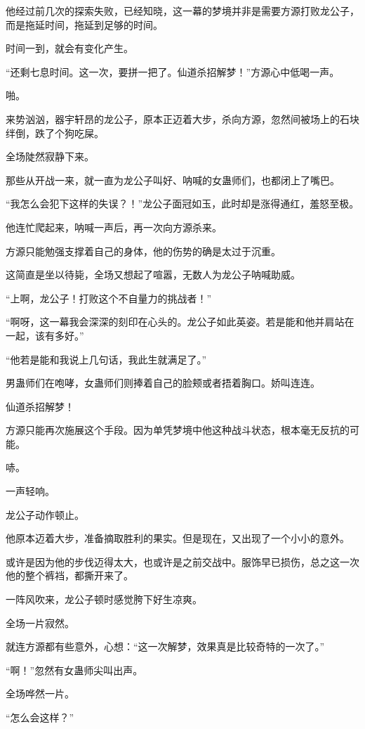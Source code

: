 \begin{this_body}
他经过前几次的探索失败，已经知晓，这一幕的梦境并非是需要方源打败龙公子，而是拖延时间，拖延到足够的时间。

时间一到，就会有变化产生。

“还剩七息时间。这一次，要拼一把了。仙道杀招解梦！”方源心中低喝一声。

啪。

来势汹汹，器宇轩昂的龙公子，原本正迈着大步，杀向方源，忽然间被场上的石块绊倒，跌了个狗吃屎。

全场陡然寂静下来。

那些从开战一来，就一直为龙公子叫好、呐喊的女蛊师们，也都闭上了嘴巴。

“我怎么会犯下这样的失误？！”龙公子面冠如玉，此时却是涨得通红，羞怒至极。

他连忙爬起来，呐喊一声后，再一次向方源杀来。

方源只能勉强支撑着自己的身体，他的伤势的确是太过于沉重。

这简直是坐以待毙，全场又想起了喧嚣，无数人为龙公子呐喊助威。

“上啊，龙公子！打败这个不自量力的挑战者！”

“啊呀，这一幕我会深深的刻印在心头的。龙公子如此英姿。若是能和他并肩站在一起，该有多好。”

“他若是能和我说上几句话，我此生就满足了。”

男蛊师们在咆哮，女蛊师们则捧着自己的脸颊或者捂着胸口。娇叫连连。

仙道杀招解梦！

方源只能再次施展这个手段。因为单凭梦境中他这种战斗状态，根本毫无反抗的可能。

哧。

一声轻响。

龙公子动作顿止。

他原本迈着大步，准备摘取胜利的果实。但是现在，又出现了一个小小的意外。

或许是因为他的步伐迈得太大，也或许是之前交战中。服饰早已损伤，总之这一次他的整个裤裆，都撕开来了。

一阵风吹来，龙公子顿时感觉胯下好生凉爽。

全场一片寂然。

就连方源都有些意外，心想：“这一次解梦，效果真是比较奇特的一次了。”

“啊！”忽然有女蛊师尖叫出声。

全场哗然一片。

“怎么会这样？”


\end{this_body}
